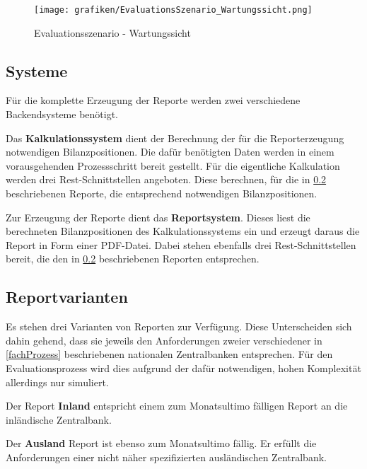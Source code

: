 \begin{figure}[!h]
	\caption{Evaluationsszenario - Wartungssicht}
	\centering
		\texttt{[image: grafiken/EvaluationsSzenario\_Wartungssicht.png]}	
	\label{fig:wartungssicht}
\end{figure}

\subsection{Systeme}
\label{systeme}
Für die komplette Erzeugung der Reporte werden zwei verschiedene Backendsysteme benötigt.

\label{kalkulationSystem}
\bigskip
\noindent Das \textbf{Kalkulationssystem} dient der Berechnung der für die Reporterzeugung notwendigen Bilanzpositionen. Die dafür benötigten Daten werden in einem vorausgehenden Prozessschritt bereit gestellt. Für die eigentliche Kalkulation werden drei Rest-Schnittstellen angeboten. Diese berechnen, für die in \ref{reporte} beschriebenen Reporte, die entsprechend notwendigen Bilanzpositionen.

\label{reportSystem}
\bigskip
\noindent Zur Erzeugung der Reporte dient das \textbf{Reportsystem}. Dieses liest die berechneten Bilanzpositionen des Kalkulationssystems ein und erzeugt daraus die Report in Form einer \ac{PDF}-Datei. Dabei stehen ebenfalls drei Rest-Schnittstellen bereit, die den in \ref{reporte} beschriebenen Reporten entsprechen.

\subsection{Reportvarianten}
\label{reporte}
Es stehen drei Varianten von Reporten zur Verfügung. Diese Unterscheiden sich dahin gehend, dass sie jeweils den Anforderungen zweier verschiedener in \ref{fachProzess} beschriebenen nationalen Zentralbanken entsprechen. Für den Evaluationsprozess wird dies aufgrund der dafür notwendigen, hohen Komplexität allerdings nur simuliert.


\label{inland}
\smallskip
\noindent Der Report \textbf{Inland} entspricht einem zum Monatsultimo fälligen Report an die inländische Zentralbank.

\newpage
\label{ausland}
\smallskip
\noindent Der \textbf{Ausland} Report ist ebenso zum Monatsultimo fällig. Er erfüllt die Anforderungen einer nicht näher spezifizierten ausländischen Zentralbank.



